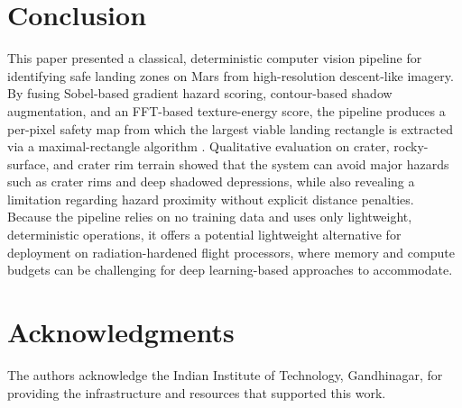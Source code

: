 \documentclass{article}
\begin{document}
\section{Conclusion}
This paper presented a classical, deterministic computer
vision pipeline for identifying safe landing zones on Mars
from high-resolution descent-like imagery. By fusing Sobel-based
gradient hazard scoring, contour-based shadow augmentation,
and an FFT-based texture-energy score, the pipeline
produces a per-pixel safety map from which the largest viable
landing rectangle is extracted via a maximal-rectangle algorithm \cite{vandevoorde1996maximal}. Qualitative evaluation on crater, rocky-surface, and crater rim
terrain showed that the system can avoid major
hazards such as crater rims and deep shadowed depressions,
while also revealing a limitation regarding hazard proximity without explicit distance penalties. Because the pipeline relies
on no training data and uses only lightweight, deterministic
operations, it offers a potential lightweight alternative for deployment
on radiation-hardened flight processors, where memory and
compute budgets can be challenging for deep learning-based approaches to accommodate.

\section*{Acknowledgments}
The authors acknowledge the Indian Institute of Technology, Gandhinagar, for providing the infrastructure and resources that supported this work.

  
  
\end{document}
